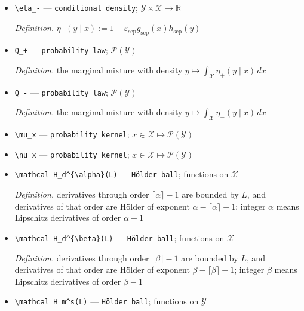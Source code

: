 \documentclass{article}
\begin{document}
\begin{itemize}
  \item \texttt{\textbackslash{}\allowbreak{}eta\_\allowbreak{}-\allowbreak{}} --- \texttt{conditional density}; \(\mathcal Y\times\mathcal X\to\mathbb R_+\)
  \par\smallskip\noindent\emph{Definition.} \(\eta_-(y\mid x):=1-\varepsilon_{\mathrm{sep}}g_{\mathrm{sep}}(x)h_{\mathrm{sep}}(y)\)
  \item \texttt{Q\_\allowbreak{}+\allowbreak{}} --- \texttt{probability law}; \(\mathcal P(\mathcal Y)\)
  \par\smallskip\noindent\emph{Definition.} the marginal mixture with density \(y\mapsto\int_{\mathcal X}\eta_+(y\mid x)\,dx\)
  \item \texttt{Q\_\allowbreak{}-\allowbreak{}} --- \texttt{probability law}; \(\mathcal P(\mathcal Y)\)
  \par\smallskip\noindent\emph{Definition.} the marginal mixture with density \(y\mapsto\int_{\mathcal X}\eta_-(y\mid x)\,dx\)
  \item \texttt{\textbackslash{}\allowbreak{}mu\_\allowbreak{}x} --- \texttt{probability kernel}; \(x\in\mathcal X\mapsto\mathcal P(\mathcal Y)\)
  \item \texttt{\textbackslash{}\allowbreak{}nu\_\allowbreak{}x} --- \texttt{probability kernel}; \(x\in\mathcal X\mapsto\mathcal P(\mathcal Y)\)
  \item \texttt{\textbackslash{}\allowbreak{}mathcal H\_\allowbreak{}d\textasciicircum{}\{\textbackslash{}\allowbreak{}alpha\}\allowbreak{}(L)} --- \texttt{Hölder ball}; functions on \(\mathcal X\)
  \par\smallskip\noindent\emph{Definition.} derivatives through order \(\lceil\alpha\rceil-1\) are bounded by \(L\), and derivatives of that order are Hölder of exponent \(\alpha-\lceil\alpha\rceil+1\); integer \(\alpha\) means Lipschitz derivatives of order \(\alpha-1\)
  \item \texttt{\textbackslash{}\allowbreak{}mathcal H\_\allowbreak{}d\textasciicircum{}\{\textbackslash{}\allowbreak{}beta\}\allowbreak{}(L)} --- \texttt{Hölder ball}; functions on \(\mathcal X\)
  \par\smallskip\noindent\emph{Definition.} derivatives through order \(\lceil\beta\rceil-1\) are bounded by \(L\), and derivatives of that order are Hölder of exponent \(\beta-\lceil\beta\rceil+1\); integer \(\beta\) means Lipschitz derivatives of order \(\beta-1\)
  \item \texttt{\textbackslash{}\allowbreak{}mathcal H\_\allowbreak{}m\textasciicircum{}s(L)} --- \texttt{Hölder ball}; functions on \(\mathcal Y\)

\end{itemize}
\end{document}

